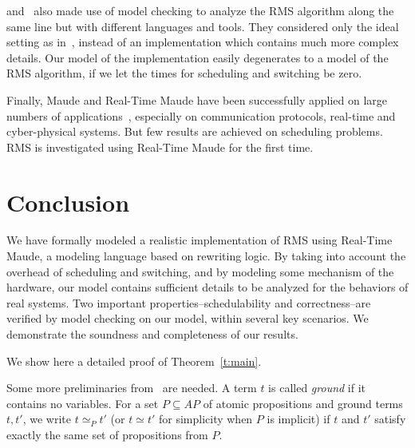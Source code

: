 \documentclass[10pt,journal]{IEEEtran}
\begin{document}
\cite{DBLP:conf/iceccs/CuiDT14} and~\cite{TianD2011} also made use of
model checking to analyze the RMS algorithm along the same line but
with different languages and tools. They considered only the ideal
setting as in~\cite{DBLP:journals/jacm/LiuL73}, instead of an
implementation which contains much more complex details. Our model of
the implementation easily degenerates to a model of the RMS algorithm,
if we let the times for scheduling and switching be zero.

Finally, Maude and Real-Time Maude have been successfully applied on
large numbers of applications~\cite{DBLP:journals/jlp/Meseguer12},
especially on communication protocols, real-time and cyber-physical
systems. But few results are achieved on scheduling problems. RMS is
investigated using Real-Time Maude for the first time.

\section{Conclusion}
\label{s:conclusion}
We have formally modeled a realistic implementation of RMS using
Real-Time Maude, a modeling language based on rewriting logic. By
taking into account the overhead of scheduling and switching, and by
modeling some mechanism of the hardware, our model contains sufficient
details to be analyzed for the behaviors of real systems. Two
important properties--schedulability and correctness--are verified by
model checking on our model, within several key scenarios. We
demonstrate the soundness and completeness of our results.

\setcounter{theorem}{0}
\renewcommand{\thetheorem}{\thesection.\arabic{theorem}}
\newcommand{\lrps}[2]{\rightarrow^{#1}_{#2}}

We show here a detailed proof of Theorem~\ref{t:main}.

Some more preliminaries from~\cite{DBLP:journals/entcs/OlveczkyM07a}
are needed. A term $t$ is called \emph{ground} if it contains no
variables. For a set $P\subseteq AP$ of atomic propositions and ground
terms $t,t'$, we write $t\simeq_P t'$ (or $t\simeq t'$ for simplicity
when $P$ is implicit) if $t$ and $t'$ satisfy exactly the same set of
propositions from $P$.
\end{document}
